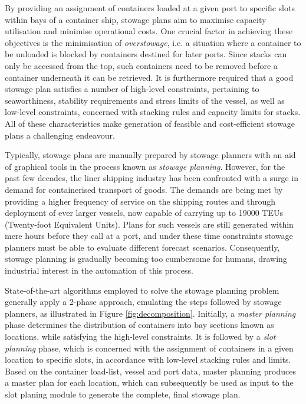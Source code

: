 \documentclass[preprint,11pt,3p]{elsarticle}
\begin{document}
By providing an assignment of containers loaded at a given port to specific slots within bays of a container ship, stowage plans aim to maximise capacity utilisation and minimise operational costs. One crucial factor in achieving these objectives is the minimisation of \textit{overstowage}, i.e. a situation where a container to be unloaded is blocked by containers destined for later ports. Since stacks can only be accessed from the top, such containers need to be removed before a container underneath it can be retrieved. It is furthermore required that a good stowage plan satisfies a number of high-level constraints, pertaining to seaworthiness, stability requirements and stress limits of the vessel, as well as low-level constraints, concerned with stacking rules and capacity limits for stacks. All of these characteristics make generation of feasible and cost-efficient stowage plans a challenging endeavour.

Typically, stowage plans are manually prepared by stowage planners with an aid of graphical tools in the process known as \textit{stowage planning}. However, for the past few decades, the liner shipping industry has been confronted with a surge in demand for containerised transport of goods. The demands are being met by providing a higher frequency of service on the shipping routes and through deployment of ever larger vessels, now capable of carrying up to 19000 TEUs (Twenty-foot Equivalent Units). Plans for such vessels are still generated within mere hours before they call at a port, and under these time constraints stowage planners must be able to evaluate different forecast scenarios. Consequently, stowage planning is gradually becoming too cumbersome for humans, drawing industrial interest in the automation of this process.

State-of-the-art algorithms employed to solve the stowage planning problem generally apply a 2-phase approach, emulating the steps followed by stowage planners, as illustrated in Figure \ref{fig:decomposition}. Initially, a \textit{master planning} phase determines the distribution of containers into bay sections known as locations, while satisfying the high-level constraints. It is followed by a \textit{slot planning} phase, which is concerned with the assignment of containers in a given location to specific slots, in accordance with low-level stacking rules and limits. Based on the container load-list, vessel and port data, master planning produces a master plan for each location, which can subsequently be used as input to the slot planing module to generate the complete, final stowage plan.
\end{document}
